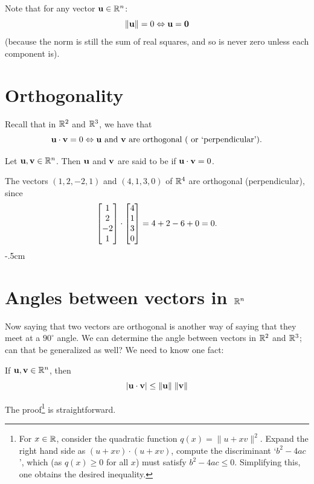 Note that for any vector $\mathbf{u} \in \mathbb{R}^n$:
$$
\Vert \mathbf{u} \Vert = 0 \Leftrightarrow \mathbf{u} = \mathbf{0}
$$
(because the norm is still the sum of real squares, and so
is never zero unless each component is).

\section{Orthogonality}

Recall that in $\mathbb{R}^2$ and $\mathbb{R}^3$, we have that
$$
\mathbf{u} \cdot \mathbf{v} = 0 \Leftrightarrow \textrm{$\mathbf{u}$ and $\mathbf{v}$ are orthogonal ( or `perpendicular').}
$$

\begin{definition}
Let $\mathbf{u},\mathbf{v} \in \mathbb{R}^n$.  Then $\mathbf{u}$ and $\mathbf{v}$ are said to be
 if $\mathbf{u} \cdot \mathbf{v} = 0$.
\end{definition}

\begin{myexample}
The vectors $(1,2,-2,1)$ and $(4,1,3,0)$ of $\mathbb{R}^4$ are orthogonal
(perpendicular), since
$$
\left[ \begin{matrix} 1\\2\\-2\\1 \end{matrix} \right] \cdot \left[ \begin{matrix} 4\\1\\3\\0 \end{matrix} \right] = 4+2-6+0 = 0.
$$
\vglue -.5cm
\end{myexample}

\section{Angles between vectors in \texorpdfstring{$\mathbb{R}^n$}{Rn}}

Now saying that two vectors are orthogonal is another way of
saying that they meet at a $90^\circ$ angle.  We can determine
the angle between vectors in $\mathbb{R}^2$ and $\mathbb{R}^3$; can that be
generalized as well?  We need to know one fact:


\begin{theorem}
If $\mathbf{u},\mathbf{v} \in \mathbb{R}^n$, then 
$$
\vert \mathbf{u} \cdot \mathbf{v} \vert \leq \Vert \mathbf{u} \Vert \; \Vert \mathbf{v} \Vert
$$
\end{theorem}

The proof\footnote{For $x\in\mathbb{R}$, consider the   quadratic function $q(x)=\|u+ x v\|^2$. Expand the right hand side as $(u+ x v)\cdot (u+ x v)$, compute the discriminant `$b^2-4ac$', which (as $q(x)\ge 0$ for all $x$) must satisfy $b^2-4ac\le 0$. Simplifying this, one obtains the desired inequality.} is straightforward.

